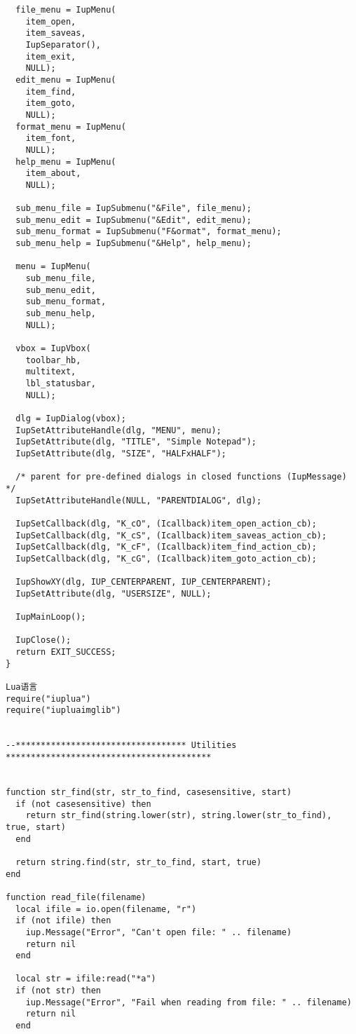 \documentclass{ctexart}
\begin{document}
\begin{lstlisting}
  file_menu = IupMenu(
    item_open,
    item_saveas,
    IupSeparator(),
    item_exit,
    NULL);
  edit_menu = IupMenu(
    item_find,
    item_goto,
    NULL);
  format_menu = IupMenu(
    item_font,
    NULL);
  help_menu = IupMenu(
    item_about,
    NULL);

  sub_menu_file = IupSubmenu("&File", file_menu);
  sub_menu_edit = IupSubmenu("&Edit", edit_menu);
  sub_menu_format = IupSubmenu("F&ormat", format_menu);
  sub_menu_help = IupSubmenu("&Help", help_menu);

  menu = IupMenu(
    sub_menu_file,
    sub_menu_edit,
    sub_menu_format,
    sub_menu_help,
    NULL);

  vbox = IupVbox(
    toolbar_hb,
    multitext,
    lbl_statusbar,
    NULL);

  dlg = IupDialog(vbox);
  IupSetAttributeHandle(dlg, "MENU", menu);
  IupSetAttribute(dlg, "TITLE", "Simple Notepad");
  IupSetAttribute(dlg, "SIZE", "HALFxHALF");

  /* parent for pre-defined dialogs in closed functions (IupMessage) */
  IupSetAttributeHandle(NULL, "PARENTDIALOG", dlg);

  IupSetCallback(dlg, "K_cO", (Icallback)item_open_action_cb);
  IupSetCallback(dlg, "K_cS", (Icallback)item_saveas_action_cb);
  IupSetCallback(dlg, "K_cF", (Icallback)item_find_action_cb);
  IupSetCallback(dlg, "K_cG", (Icallback)item_goto_action_cb);

  IupShowXY(dlg, IUP_CENTERPARENT, IUP_CENTERPARENT);
  IupSetAttribute(dlg, "USERSIZE", NULL);

  IupMainLoop();

  IupClose();
  return EXIT_SUCCESS;
}

Lua语言
require("iuplua")
require("iupluaimglib")


--********************************** Utilities *****************************************


function str_find(str, str_to_find, casesensitive, start)
  if (not casesensitive) then
    return str_find(string.lower(str), string.lower(str_to_find), true, start)
  end

  return string.find(str, str_to_find, start, true)
end

function read_file(filename)
  local ifile = io.open(filename, "r")
  if (not ifile) then
    iup.Message("Error", "Can't open file: " .. filename)
    return nil
  end
  
  local str = ifile:read("*a")
  if (not str) then
    iup.Message("Error", "Fail when reading from file: " .. filename)
    return nil
  end
  

\end{lstlisting}
\end{document}
